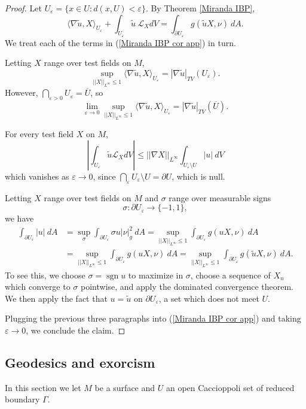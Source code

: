 \documentclass[reqno,12pt,letterpaper]{amsart}
\DeclareMathOperator{\sgn}{sgn}
\theoremstyle{definition}
\numberwithin{equation}{section}
\begin{document}
\begin{proof}
Let $U_\varepsilon = \{x \in U: d(x, U) < \varepsilon\}$.
By Theorem \ref{Miranda IBP},
\begin{equation}
\label{Miranda IBP cor app}
\langle \nabla \tilde u, X\rangle_{U_\varepsilon} + \int_{U_\varepsilon} \tilde u~\mathcal L_XdV = \int_{\partial U_\varepsilon} g(\tilde u X, \nu) ~dA.
\end{equation}
We treat each of the terms in (\ref{Miranda IBP cor app}) in turn.

Letting $X$ range over test fields on $M$,
$$\sup_{||X||_{L^\infty} \leq 1} \langle \nabla \tilde u, X\rangle_{U_\varepsilon} = |\nabla \tilde u|_{TV}(U_\varepsilon).$$
However, $\bigcap_{\varepsilon > 0} U_\varepsilon = \overline U$, so
$$\lim_{\varepsilon \to 0}\sup_{||X||_{L^\infty} \leq 1} \langle \nabla \tilde u, X\rangle_{U_\varepsilon} = |\nabla \tilde u|_{TV}(\overline U).$$

For every test field $X$ on $M$,
$$\left|\int_{U_\varepsilon} \tilde u \mathcal L_XdV\right| \leq ||\nabla X||_{L^\infty} \int_{U_\varepsilon \setminus U} |u| ~dV$$
which vanishes as $\varepsilon \to 0$, since $\bigcap_\varepsilon U_\varepsilon \setminus U = \partial U$, which is null.

Letting $X$ range over test fields on $M$ and $\sigma$ range over measurable signs
$$\sigma: \partial U_\varepsilon \to \{-1, 1\},$$
we have
\begin{align*}
\int_{\partial U_\varepsilon} |u| ~dA &= \sup_\sigma \int_{\partial U_\varepsilon} \sigma u |\nu|_g^2 ~dA = \sup_{||X||_{L^\infty} \leq 1} \int_{\partial U_\varepsilon} g(uX, \nu) ~dA\\
&= \sup_{||X||_{L^\infty} \leq 1} \int_{\partial U_\varepsilon} g(uX, \nu) ~dA = \sup_{||X||_{L^\infty} \leq 1} \int_{\partial U_\varepsilon} g(\tilde uX, \nu) ~dA.
\end{align*}
To see this, we choose $\sigma = \sgn u$ to maximize in $\sigma$, choose a sequence of $X_n$ which converge to $\sigma$ pointwise, and apply the dominated convergence theorem.
We then apply the fact that $u = \tilde u$ on $\partial U_\varepsilon$, a set which does not meet $U$.

Plugging the previous three paragraphs into (\ref{Miranda IBP cor app}) and taking $\varepsilon \to 0$, we conclude the claim.
\end{proof}

\subsection{Geodesics and exorcism}
In this section we let $M$ be a surface and $U$ an open Caccioppoli set of reduced boundary $\Gamma$.
\end{document}
